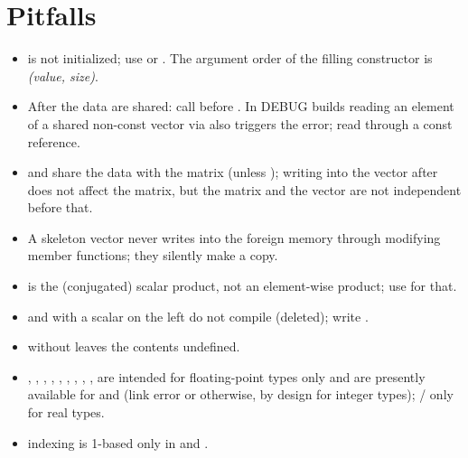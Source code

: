 \section{Pitfalls}\label{sec:vec:pitfalls}

\begin{itemize}
\item {} is not initialized; use  or .
The argument order of the filling constructor is \emph{(value, size)}.
\item After  the data are shared: call  before . In DEBUG builds reading an element
of a shared non-const vector via  also triggers the error; read through a const reference.
\item {} and  share the data with the matrix (unless ); writing into
the vector after  does not affect the matrix, but the matrix and the vector are not independent before that.
\item A skeleton vector  never writes into the foreign memory through modifying member functions; they
silently make a copy.
\item {} is the (conjugated) scalar product, not an element-wise product; use  for that.
\item {} and  with a scalar  on the left do not compile (deleted); write .
\item {} without  leaves the contents undefined.
\item {}, , , , , , , ,
,  are intended for floating-point types only and are presently available for  and
 (link error or  otherwise, by design for integer types); / only for real types.
\item {} indexing is 1-based only in  and .
\end{itemize}
